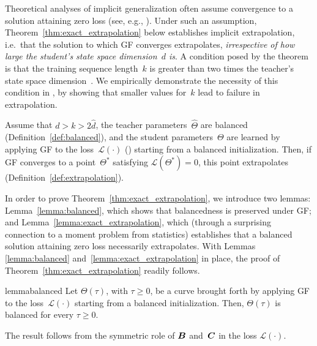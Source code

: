 Theoretical analyses of implicit generalization often assume convergence to a solution attaining zero loss (see, e.g., \cite{azulay2021implicit, gunasekar2017implicit, lyu2019gradient, woodworth2020kernel}).
Under such an assumption, Theorem~\ref{thm:exact_extrapolation} below establishes implicit extrapolation, i.e.~that the solution to which GF converges extrapolates, \emph{irrespective of how large the student's state space dimension~$d$ is}.
A condition posed by the theorem is that the training sequence length~$k$ is greater than two times the teacher's state space dimension~.
We empirically demonstrate the necessity of this condition in , by showing that smaller values for~$k$ lead to failure in extrapolation.
\begin{theorem}\label{thm:exact_extrapolation}
Assume that $d > k > 2\hat{d}$, the teacher parameters~$\hat{\Theta}$ are balanced (Definition~\ref{def:balanced}), and the student parameters~$\Theta$ are learned by applying GF to the loss~$\mathcal{L} ( \cdot )$ () starting from a balanced initialization.
Then, if GF converges to a point~$\Theta^*$ satisfying $\mathcal{L} ( \Theta^* ) = 0$, this point extrapolates (Definition~\ref{def:extrapolation}).
\end{theorem}

In order to prove Theorem~\ref{thm:exact_extrapolation}, we introduce two lemmas:
Lemma~\ref{lemma:balanced}, which shows that balancedness is preserved under GF;
and 
Lemma~\ref{lemma:exact_extrapolation}, which (through a surprising connection to a moment problem from statistics) establishes that a balanced solution attaining zero loss necessarily extrapolates. With Lemmas \ref{lemma:balanced} and~\ref{lemma:exact_extrapolation} in place, the proof of Theorem~\ref{thm:exact_extrapolation} readily follows.

\begin{restatable}{lemma}{balanced}
\label{lemma:balanced}
Let $\Theta(\tau)$, with $\tau \geq 0$, be a curve brought forth by applying GF to the loss~$\mathcal{L} ( \cdot )$ starting from a balanced initialization.
Then, $\Theta(\tau)$ is balanced for every $\tau \geq 0$.
\end{restatable}
\begin{sproof}
The result follows from the symmetric role of ${\bm{B}}$ and~${\bm{C}}$ in the loss $\mathcal{L} ( \cdot )$.
\end{sproof}

